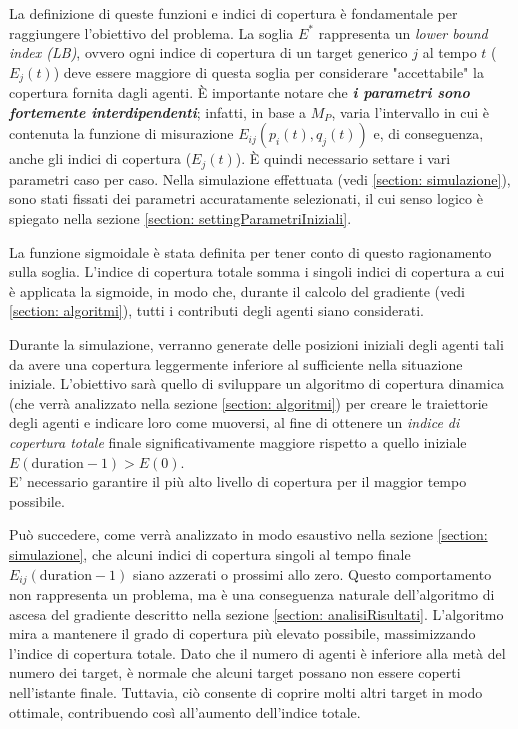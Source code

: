 \documentclass[twoside]{article}
\begin{document}
La definizione di queste funzioni e indici di copertura è fondamentale per raggiungere l'obiettivo del problema. La soglia \textit{$E^*$} rappresenta un \textit{lower bound index (LB)}, ovvero ogni indice di copertura di un target generico $j$ al tempo $t$ (\ensuremath{E_j(t)}) deve essere maggiore di questa soglia per considerare "accettabile" la copertura fornita dagli agenti. È importante notare che \textit{\textbf{i parametri sono fortemente interdipendenti}}; infatti, in base a $M_P$, varia l'intervallo in cui è contenuta la funzione di misurazione \ensuremath{E_{ij}(p_i(t), q_j(t))} e, di conseguenza, anche gli indici di copertura (\ensuremath{E_j(t)}). È quindi necessario settare i vari parametri caso per caso. Nella simulazione effettuata (vedi \ref{section: simulazione}), sono stati fissati dei parametri accuratamente selezionati, il cui senso logico è spiegato nella sezione \ref{section: settingParametriIniziali}.


\vspace{\baselineskip}

La funzione sigmoidale è stata definita per tener conto di questo ragionamento sulla soglia. L'indice di copertura totale somma i singoli indici di copertura a cui è applicata la sigmoide, in modo che, durante il calcolo del gradiente (vedi \ref{section: algoritmi}), tutti i contributi degli agenti siano considerati.


\vspace{\baselineskip}

Durante la simulazione, verranno generate delle posizioni iniziali degli agenti tali da avere una copertura leggermente inferiore al sufficiente nella situazione iniziale. L'obiettivo sarà quello di sviluppare un algoritmo di copertura dinamica (che verrà analizzato nella sezione \ref{section: algoritmi}) per creare le traiettorie degli agenti e indicare loro come muoversi, al fine di ottenere un \textit{indice di copertura totale} finale significativamente maggiore rispetto a quello iniziale \ensuremath{E(\text{duration}-1) > E(0)}.\\
E' necessario garantire il più alto livello di copertura per il maggior tempo possibile.

\vspace{\baselineskip}

Può succedere, come verrà analizzato in modo esaustivo nella sezione \ref{section: simulazione}, che alcuni indici di copertura singoli al tempo finale \ensuremath{E_{ij}(\text{duration}-1)} siano azzerati o prossimi allo zero.
Questo comportamento non rappresenta un problema, ma è una conseguenza naturale dell'algoritmo di ascesa del gradiente descritto nella sezione \ref{section: analisiRisultati}. L'algoritmo mira a mantenere il grado di copertura più elevato possibile, massimizzando l'indice di copertura totale. Dato che il numero di agenti è inferiore alla metà del numero dei target, è normale che alcuni target possano non essere coperti nell'istante finale. Tuttavia, ciò consente di coprire molti altri target in modo ottimale, contribuendo così all'aumento dell'indice totale.
\end{document}

